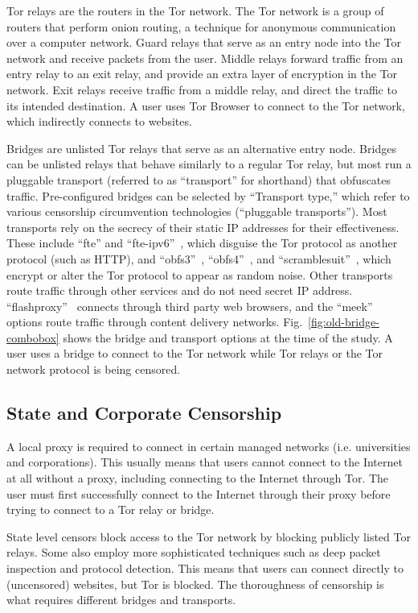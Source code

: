 \documentclass[USenglish,oneside,twocolumn]{article}
\begin{document}
Tor relays are the routers in the Tor network. The Tor network is a group of routers that perform onion routing, a technique for anonymous communication over a computer network.  
Guard relays that serve as an entry node into the Tor network and receive packets from the user. Middle relays forward traffic from an entry relay to an exit relay, and provide an extra layer of encryption in the Tor network. Exit relays receive traffic from a middle relay, and direct the traffic to its intended destination. 
A user uses Tor Browser to connect to the Tor network, which indirectly connects to websites. 

Bridges are unlisted Tor relays that serve as an alternative entry node.
Bridges can be unlisted relays that behave similarly to a regular Tor relay,  
but most run a pluggable transport (referred to as ``transport'' for shorthand) that obfuscates traffic. 
Pre-configured bridges can be selected by ``Transport type,'' which refer to various
censorship circumvention technologies (``pluggable transports'').
Most transports rely on the secrecy of their static IP addresses for their effectiveness.
These include ``fte'' and ``fte-ipv6''~\cite{fte},
which disguise the Tor protocol as another protocol (such as HTTP), and
``obfs3''~\cite{obfs3}, ``obfs4''~\cite{obfs4}, and ``scramblesuit''~\cite{scramblesuit},
which encrypt or alter the Tor protocol to appear as random noise.
Other transports route traffic through other services and do not need secret IP address. 
``flashproxy''~\cite{flashproxy} connects through third party web browsers,
and the ``meek''~\cite{fifield2015blocking} options route traffic
through content delivery networks. Fig.~\ref{fig:old-bridge-combobox} shows the bridge and transport options at the time of the study. A user uses a bridge to connect to the Tor network while Tor relays or the Tor network protocol is being censored. 

\subsection{State and Corporate Censorship}
A local proxy is required to connect in certain managed networks (i.e. universities and corporations). This usually means that users cannot connect to the Internet at all without a proxy, including connecting to the Internet through Tor. The user must first successfully connect to the Internet through their proxy before trying to connect to a Tor relay or bridge. 

State level censors block access to the Tor network by blocking publicly listed Tor relays. Some also employ more sophisticated techniques such as deep packet inspection and protocol detection. This means that users can connect directly to (uncensored) websites, but Tor is blocked. The thoroughness of censorship is what requires different bridges and transports. 
\end{document}
